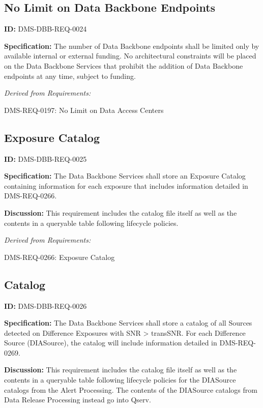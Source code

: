 \documentclass[SE,toc]{lsstdoc}
\begin{document}
\subsection{No Limit on Data Backbone Endpoints}

\label{DMS-DBB-REQ-0024}
\textbf{ID:} DMS-DBB-REQ-0024

\textbf{Specification:}
The number of Data Backbone endpoints shall be limited only by available internal or external funding. No architectural constraints will be placed on the Data Backbone Services that prohibit the addition of Data Backbone endpoints at any time, subject to funding.

\emph{Derived from Requirements:}

DMS-REQ-0197:
No Limit on Data Access Centers \newline

\subsection{Exposure Catalog}

\label{DMS-DBB-REQ-0025}
\textbf{ID:} DMS-DBB-REQ-0025

\textbf{Specification:}
The Data Backbone Services shall store an Exposure Catalog containing information for each exposure that includes information detailed in DMS-REQ-0266.

\textbf{Discussion:}
This requirement includes the catalog file itself as well as the contents in a queryable table following lifecycle policies.

\emph{Derived from Requirements:}

DMS-REQ-0266:
Exposure Catalog \newline

\subsection{Catalog}

\label{DMS-DBB-REQ-0026}
\textbf{ID:} DMS-DBB-REQ-0026

\textbf{Specification:}
The Data Backbone Services shall store a catalog of all Sources detected on Difference Exposures with SNR > transSNR.   For each Difference Source (DIASource), the catalog will include information detailed in DMS-REQ-0269.

\textbf{Discussion:}
This requirement includes the catalog file itself as well as the contents in a queryable table following lifecycle policies for the DIASource catalogs from the Alert Processing.  The contents of the DIASource catalogs from Data Release Processing instead go into Qserv.
\end{document}
